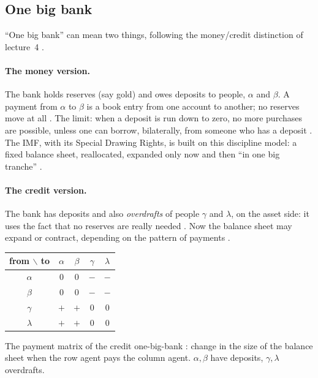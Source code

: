\begin{paracol}{2}
\section{One big bank}\label{sec:ch-onebank}

``One big bank'' can mean two things, following the money/credit distinction of lecture~4 .

\paragraph{The money version.} The bank holds reserves (say gold) and owes deposits to people, $\alpha$ and $\beta$. A payment from
$\alpha$ to $\beta$ is a book entry from one account to another; no reserves move at all . The limit: when a
deposit is run down to zero, no more purchases are possible, unless one can borrow, bilaterally, from someone who has a deposit
. The IMF, with its Special Drawing Rights, is built on this discipline model: a fixed balance sheet, reallocated,
expanded only now and then ``in one big tranche'' .

\paragraph{The credit version.} The bank has deposits and also \emph{overdrafts} of people $\gamma$ and $\lambda$, on the asset side: it
uses the fact that no reserves are really needed . Now the balance sheet may expand or contract, depending on the
pattern of payments .
\begin{taccts}
\qquad
{}
\end{taccts}

\begin{nfigure}
\renewcommand{\arraystretch}{1.35}
\begin{tabular}{c|cc|cc}
from $\backslash$ to & $\alpha$ & $\beta$ & $\gamma$ & $\lambda$\\\hline
$\alpha$ & 0 & 0 & $-$ & $-$\\
$\beta$ & 0 & 0 & $-$ & $-$\\\hline
$\gamma$ & $+$ & $+$ & 0 & 0\\
$\lambda$ & $+$ & $+$ & 0 & 0\\
\end{tabular}
\caption{The payment matrix of the credit one-big-bank : change in the size of the balance sheet when the row agent pays the
column agent. $\alpha,\beta$ have deposits, $\gamma,\lambda$ overdrafts.}\label{fig:ch-matrix}
\end{nfigure}


\end{paracol}
